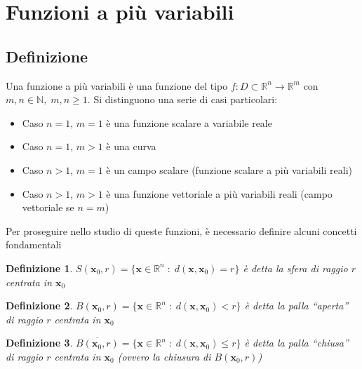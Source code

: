 \documentclass{article}
\newtheorem{definition}{Definizione}
\begin{document}
\section{Funzioni a più variabili}
    \subsection{Definizione}
        Una funzione a più variabili è una funzione del tipo $f: D \subset \mathbb{R}^{n} \rightarrow \mathbb{R}^{m}$ con $m, n \in \mathbb{N}, \; m, n \geq 1$. Si distinguono una serie di casi particolari:
        \begin{itemize}
            \item Caso $n = 1$, $m = 1$ è una funzione scalare a variabile reale
            \item Caso $n = 1$, $m > 1$ è una curva 
            \item Caso $n > 1$, $m = 1$ è un campo scalare (funzione scalare a più variabili reali)
            \item Caso $n > 1$, $m > 1$ è una funzione vettoriale a più variabili reali (campo vettoriale se $n = m$)
        \end{itemize}

        \vspace{10pt}
        Per proseguire nello studio di queste funzioni, è necessario definire alcuni concetti fondamentali
        \begin{definition}
            $S(\mathbf{x}_0, r) = \{ \mathbf{x} \in \mathbb{R}^{n} \; : \; d(\mathbf{x}, \mathbf{x}_0) = r \}$ è detta la sfera di raggio $r$ centrata in $\mathbf{x}_0$
        \end{definition}
        \begin{definition}
            $B(\mathbf{x}_0, r) = \{ \mathbf{x} \in \mathbb{R}^{n} \; : \; d(\mathbf{x}, \mathbf{x}_0) < r \}$ è detta la palla ``aperta'' di raggio $r$ centrata in $\mathbf{x}_0$
        \end{definition}
        \begin{definition}
            $\overline{B(\mathbf{x}_0, r)} = \{ \mathbf{x} \in \mathbb{R}^{n} \; : \; d(\mathbf{x}, \mathbf{x}_0) \leq r \}$ è detta la palla ``chiusa'' di raggio $r$ centrata in $\mathbf{x}_0$ (ovvero la chiusura di $B(\mathbf{x}_0, r)$)
        \end{definition}
\end{document}
